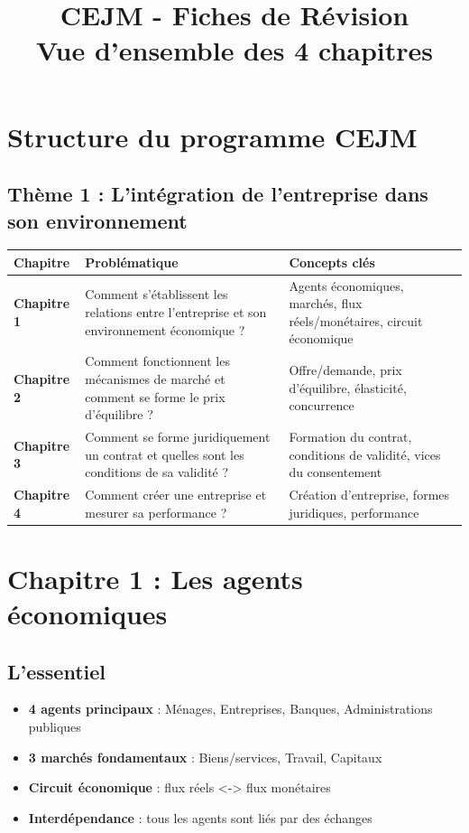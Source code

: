 \documentclass[12pt,a4paper]{article}
\title{\textbf{CEJM - Fiches de Révision}\\[2mm]\large Vue d'ensemble des 4 chapitres}
\author{}
\date{}
\begin{document}
\maketitle

\section*{Structure du programme CEJM}

\subsection*{Thème 1 : L'intégration de l'entreprise dans son environnement}

\begin{center}
\begin{tabular}{|p{3cm}|p{6cm}|p{6cm}|}
\hline
\textbf{Chapitre} & \textbf{Problématique} & \textbf{Concepts clés} \\
\hline
\textbf{Chapitre 1} & Comment s'établissent les relations entre l'entreprise et son environnement économique ? & Agents économiques, marchés, flux réels/monétaires, circuit économique \\
\hline
\textbf{Chapitre 2} & Comment fonctionnent les mécanismes de marché et comment se forme le prix d'équilibre ? & Offre/demande, prix d'équilibre, élasticité, concurrence \\
\hline
\textbf{Chapitre 3} & Comment se forme juridiquement un contrat et quelles sont les conditions de sa validité ? & Formation du contrat, conditions de validité, vices du consentement \\
\hline
\textbf{Chapitre 4} & Comment créer une entreprise et mesurer sa performance ? & Création d'entreprise, formes juridiques, performance \\
\hline
\end{tabular}
\end{center}

\section{Chapitre 1 : Les agents économiques}

\subsection{L'essentiel}
\begin{itemize}
    \item \textbf{4 agents principaux} : Ménages, Entreprises, Banques, Administrations publiques
    \item \textbf{3 marchés fondamentaux} : Biens/services, Travail, Capitaux
    \item \textbf{Circuit économique} : flux réels <-> flux monétaires
    \item \textbf{Interdépendance} : tous les agents sont liés par des échanges
\end{itemize}
\end{document}
